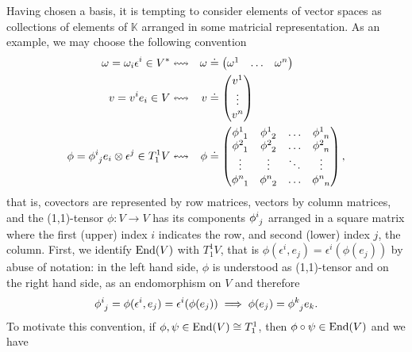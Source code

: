 \begin{remark}
    Having chosen a basis, it is tempting to consider elements of vector spaces as collections of elements of \(\mathbb{K}\) arranged in some matricial representation. As an example, we may choose the following convention
    \begin{equation*}
        \begin{aligned}
            \omega = \omega_i \epsilon^i \in V ^{\ast}& \leftrightsquigarrow & \omega &\doteq \begin{pmatrix}\omega^1 & \dots & \omega^n\end{pmatrix}\\
            v = v^ie_i \in V & \leftrightsquigarrow & v &\doteq \begin{pmatrix}v^1\\\vdots\\v^n\end{pmatrix}\\
            \phi = \phi\indices{^i_j} e_i \otimes \epsilon^j\in T_1^1V & \leftrightsquigarrow & \phi &\doteq \begin{pmatrix}\phi\indices{^1_1}&\phi\indices{^1_2}&\dots&\phi\indices{^1_n}\\\phi\indices{^2_1}&\phi\indices{^2_2}&\dots&\phi\indices{^2_n}\\\vdots&\vdots&\ddots&\vdots\\\phi\indices{^n_1}&\phi\indices{^n_2}&\dots&\phi\indices{^n_n}\\\end{pmatrix},
        \end{aligned}
    \end{equation*}
    that is, covectors are represented by row matrices, vectors by column matrices, and the (1,1)-tensor \(\phi : V \to V\) has its components \(\phi\indices{^i_j}\) arranged in a square matrix where the first (upper) index \(i\) indicates the row, and second (lower) index \(j\), the column. First, we identify \(\operatorname{End}(V)\) with \(T_1^1V\), that is \(\phi(\epsilon^i, e_j) = \epsilon^i(\phi(e_j))\) by abuse of notation: in the left hand side, \(\phi\) is understood as (1,1)-tensor and on the right hand side, as an endomorphism on \(V\) and therefore
    \begin{equation*}
        \phi\indices{^i_j} = \phi(\epsilon^i, e_j) = \epsilon^i(\phi(e_j)) \implies \phi(e_j) = \phi\indices{^k_j}e_k.
    \end{equation*}
    To motivate this convention, if \(\phi, \psi \in \operatorname{End}(V) \cong T_1^1\), then \(\phi \circ \psi \in \operatorname{End}(V)\) and we have

\end{remark}
